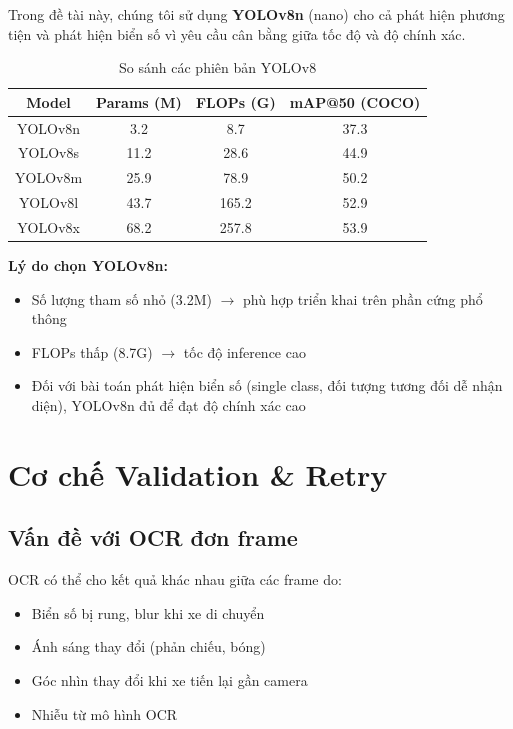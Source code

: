 Trong đề tài này, chúng tôi sử dụng \textbf{YOLOv8n} (nano) cho cả phát hiện phương tiện và phát hiện biển số vì yêu cầu cân bằng giữa tốc độ và độ chính xác.

\begin{table}[!ht]
\centering
\caption{So sánh các phiên bản YOLOv8}
\label{tab:yolov8_versions}
\begin{tabular}{|c|c|c|c|}
\hline
\textbf{Model} & \textbf{Params (M)} & \textbf{FLOPs (G)} & \textbf{mAP@50 (COCO)} \\ \hline
YOLOv8n & 3.2 & 8.7 & 37.3 \\ \hline
YOLOv8s & 11.2 & 28.6 & 44.9 \\ \hline
YOLOv8m & 25.9 & 78.9 & 50.2 \\ \hline
YOLOv8l & 43.7 & 165.2 & 52.9 \\ \hline
YOLOv8x & 68.2 & 257.8 & 53.9 \\ \hline
\end{tabular}
\end{table}

\textbf{Lý do chọn YOLOv8n:}
\begin{itemize}
    \item Số lượng tham số nhỏ (3.2M) $\rightarrow$ phù hợp triển khai trên phần cứng phổ thông
    \item FLOPs thấp (8.7G) $\rightarrow$ tốc độ inference cao
    \item Đối với bài toán phát hiện biển số (single class, đối tượng tương đối dễ nhận diện), YOLOv8n đủ để đạt độ chính xác cao
\end{itemize}

\section{Cơ chế Validation \& Retry}

\subsection{Vấn đề với OCR đơn frame}
OCR có thể cho kết quả khác nhau giữa các frame do:
\begin{itemize}
    \item Biển số bị rung, blur khi xe di chuyển
    \item Ánh sáng thay đổi (phản chiếu, bóng)
    \item Góc nhìn thay đổi khi xe tiến lại gần camera
    \item Nhiễu từ mô hình OCR
\end{itemize}

